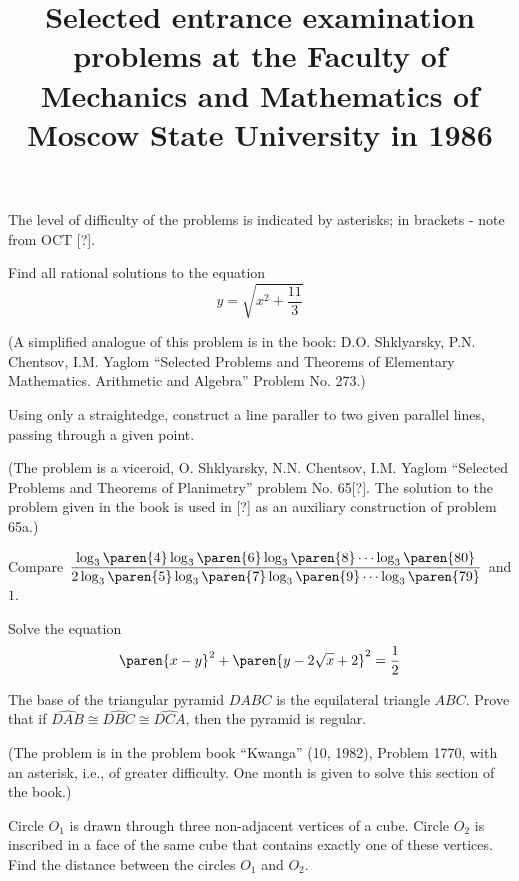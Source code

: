 \documentclass{article}
\title{Selected entrance examination problems at the Faculty of Mechanics and Mathematics of Moscow State University in 1986}
\author{}
\date{}
\begin{document}
\maketitle
\vspace{-0.4cm}
The level of difficulty of the problems is indicated by asterisks; in brackets - note from OCT [?].
\vspace{0.5cm}


\problem
Find all rational solutions to the equation
\begin{equation*}
  y = \sqrt{x^2 + \frac{11}{3}}
\end{equation*}

(A simplified analogue of this problem is in the book:
D.O. Shklyarsky, P.N. Chentsov, I.M. Yaglom
``Selected Problems and Theorems of Elementary Mathematics. Arithmetic and Algebra''
Problem No. 273.)


\problem
Using only a straightedge, construct a line paraller to two given parallel lines, passing through a given point.

(The problem is a viceroid, O. Shklyarsky, N.N. Chentsov, I.M. Yaglom ``Selected Problems and Theorems of Planimetry'' problem No. 65[?].
The solution to the problem given in the book is used in [?] as an auxiliary construction of problem 65a.)


\problem[{**}]
Compare
$\mspace{1.5mu}
 \dfrac{\log_3\paren{4} \log_3\paren{6} \log_3\paren{8} \cdots \log_3\paren{80}}
       {2 \log_3\paren{5} \log_3\paren{7} \log_3\paren{9} \cdots \log_3\paren{79}}
\mspace{1.5mu}$
and $1$.


\problem
Solve the equation
\begin{equation*}
  \paren{x - y}^2 + \paren{y - 2 \sqrt{x} + 2}^2 = \frac{1}{2}
\end{equation*}


\problem[{**}]
The base of the triangular pyramid $DABC$ is the equilateral triangle $ABC$.
Prove that if $\widehat{DAB} \cong \widehat{DBC} \cong \widehat{DCA}$,
then the pyramid is regular.

(The problem is in the problem book ``Kwanga'' (10, 1982), Problem 1770, with an asterisk, i.e., of greater difficulty.
One month is given to solve this section of the book.)


\problem[{*}]
Circle $O_1$ is drawn through three non-adjacent vertices of a cube.
Circle $O_2$ is inscribed in a face of the same cube that contains exactly one of these vertices.
Find the distance between the circles $O_1$ and $O_2$.
\end{document}
